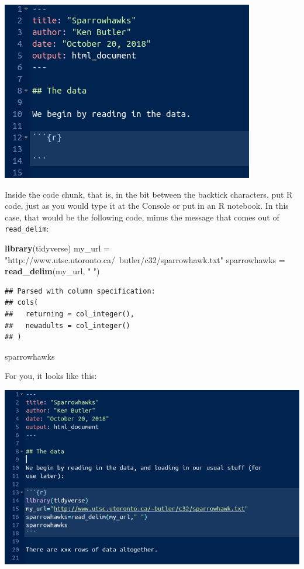 \documentclass[]{tufte-book}
\newenvironment{Shaded}{}{}
\newcommand{\KeywordTok}[1]{\textcolor[rgb]{0.00,0.44,0.13}{\textbf{#1}}}
\newcommand{\NormalTok}[1]{#1}
\newcommand{\StringTok}[1]{\textcolor[rgb]{0.25,0.44,0.63}{#1}}
\theoremstyle{definition}
\theoremstyle{definition}
\theoremstyle{definition}
\theoremstyle{remark}
\begin{document}
\includegraphics{sh1.png}

Inside the code chunk, that is, in the bit between the backtick
characters, put R code, just as you would type it at the Console or put
in an R notebook. In this case, that would be the following code, minus
the message that comes out of \texttt{read\_delim}:

\begin{Shaded}
\begin{Highlighting}[]
\KeywordTok{library}\NormalTok{(tidyverse)}
\NormalTok{my_url =}\StringTok{ "http://www.utsc.utoronto.ca/~butler/c32/sparrowhawk.txt"}
\NormalTok{sparrowhawks =}\StringTok{ }\KeywordTok{read_delim}\NormalTok{(my_url, }\StringTok{" "}\NormalTok{)}
\end{Highlighting}
\end{Shaded}

\begin{verbatim}
## Parsed with column specification:
## cols(
##   returning = col_integer(),
##   newadults = col_integer()
## )
\end{verbatim}

\begin{Shaded}
\begin{Highlighting}[]
\NormalTok{sparrowhawks}
\end{Highlighting}
\end{Shaded}

For you, it looks like this:

\includegraphics{sh2.png}
\end{document}
